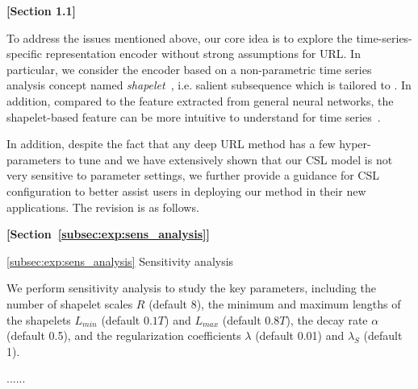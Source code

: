 \begin{sloppypar}
\begin{framed}
    \textbf{[Section 1.1]} 
    
    To address the issues mentioned above, our core idea is to explore the time-series-specific representation encoder without strong assumptions for URL. In particular, we consider the encoder based on a non-parametric time series analysis concept named \textit{shapelet}~\cite{ye2011time}, i.e. salient subsequence which is tailored to .  In addition, compared to the feature extracted from general neural networks, the shapelet-based feature can be more intuitive to understand for time series~\cite{ye2011time,liang2024fedst}.
\end{framed}


In addition, despite the fact that any deep URL method has a few hyper-parameters to tune and we have extensively shown that our CSL model is not very sensitive to parameter settings, we further provide a guidance for CSL configuration to better assist users in deploying our method in their new applications. The revision is as follows.

\begin{framed}
\textbf{[Section~\ref{subsec:exp:sens_analysis}]}

\noindent
\ref{subsec:exp:sens_analysis} Sensitivity analysis

We perform sensitivity analysis to study the key parameters, including the number of shapelet scales $R$ (default 8), the  minimum and maximum lengths of the shapelets $L_{min}$ (default $0.1T$) and $L_{max}$ (default $0.8T$), the decay rate $\alpha$ (default 0.5), and the regularization coefficients $\lambda$ (default 0.01) and $\lambda_S$ (default 1). 

......

\end{framed}



\end{sloppypar}
